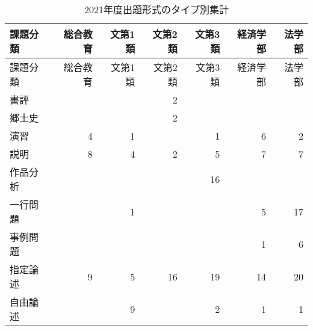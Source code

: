 \documentclass[11pt,a4paper,uplatex]{jsarticle}
\renewcommand\refname{参考文献}
\begin{document}
\begin{longtable}[]{@{}lrrrrrr@{}}
\caption{2021年度出題形式のタイプ別集計}\tabularnewline
\toprule()
課題分類 & 総合教育 & 文第1類 & 文第2類 & 文第3類 & 経済学部 & 法学部 \\
\midrule()
\endfirsthead
\toprule()
課題分類 & 総合教育 & 文第1類 & 文第2類 & 文第3類 & 経済学部 & 法学部 \\
\midrule()
\endhead
書評 & & & 2 & & & \\
郷土史 & & & 2 & & & \\
演習 & 4 & 1 & & 1 & 6 & 2 \\
説明 & 8 & 4 & 2 & 5 & 7 & 7 \\
作品分析 & & & & 16 & & \\
一行問題 & & 1 & & & 5 & 17 \\
事例問題 & & & & & 1 & 6 \\
指定論述 & 9 & 5 & 16 & 19 & 14 & 20 \\
自由論述 & & 9 & & 2 & 1 & 1 \\
\bottomrule()
\end{longtable}

\newpage
\theendnotes


\newpage
\renewcommand\refname{参考文献}

\end{document}
